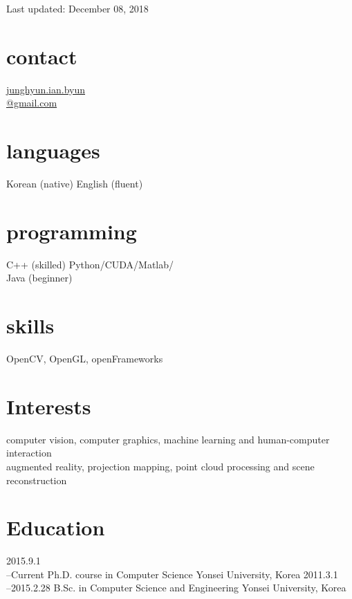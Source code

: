 \documentclass[]{friggeri-cv}
\begin{document}
       {Last updated: December 08, 2018}

\begin{aside}
  \section{contact}
    \href{mailto:junghyun.ian.byun@gmail.com}{junghyun.ian.byun\\@gmail.com}
  \section{languages}
    Korean (native)
    English (fluent)
  \section{programming}
    C++ (skilled)
    Python/CUDA/Matlab/\\Java (beginner)
  \section{skills}
    OpenCV, OpenGL, openFrameworks
\end{aside}


\section{Interests}

computer vision, computer graphics, machine learning and human-computer interaction\\
augmented reality, projection mapping, point cloud processing and scene reconstruction

\section{Education}

\begin{entrylist}
  \entry
    {2015.9.1\\--Current}
    {Ph.D. {\normalfont course in Computer Science}}
    {Yonsei University, Korea}
    {}
  \entry
    {2011.3.1\\--2015.2.28}
    {B.Sc. {\normalfont in Computer Science and Engineering}}
    {Yonsei University, Korea}
    {}
\end{entrylist}
\end{document}
